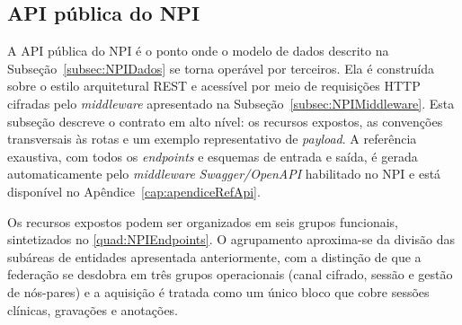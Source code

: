 \subsection{API pública do NPI}\label{subsec:NPIAPI}

A API pública do NPI é o ponto onde o modelo de dados descrito na Subseção~\ref{subsec:NPIDados} se torna operável por terceiros. Ela é construída sobre o estilo arquitetural REST e acessível por meio de requisições HTTP cifradas pelo \textit{middleware} apresentado na Subseção~\ref{subsec:NPIMiddleware}. Esta subseção descreve o contrato em alto nível: os recursos expostos, as convenções transversais às rotas e um exemplo representativo de \textit{payload}. A referência exaustiva, com todos os \textit{endpoints} e esquemas de entrada e saída, é gerada automaticamente pelo \textit{middleware} \textit{Swagger/OpenAPI} habilitado no NPI e está disponível no Apêndice~\ref{cap:apendiceRefApi}.

Os recursos expostos podem ser organizados em seis grupos funcionais, sintetizados no \autoref{quad:NPIEndpoints}. O agrupamento aproxima-se da divisão das subáreas de entidades apresentada anteriormente, com a distinção de que a federação se desdobra em três grupos operacionais (canal cifrado, sessão e gestão de nós-pares) e a aquisição é tratada como um único bloco que cobre sessões clínicas, gravações e anotações.


